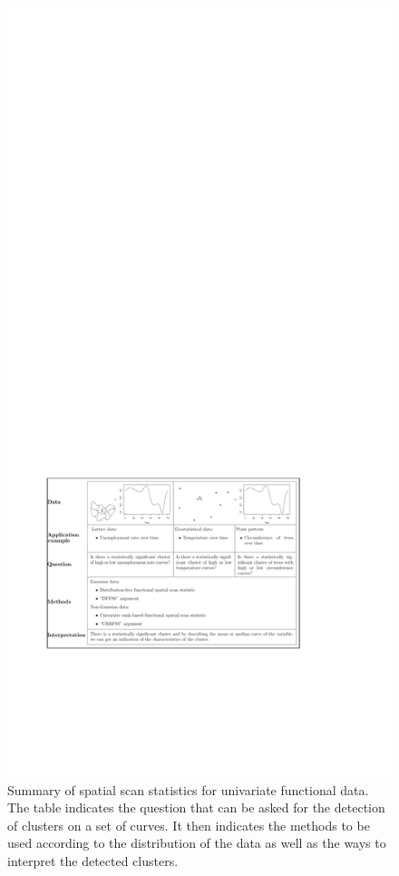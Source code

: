 \begin{figure}[h!]
\centering
\includegraphics[width=\linewidth]{code_RJ_unifonc.pdf}
\caption{Summary of spatial scan statistics for univariate functional data. The table indicates the question that can be asked for the detection of clusters on a set of curves. It then indicates the methods to be used according to the distribution of the data as well as the ways to interpret the detected clusters.
}
\end{figure}
